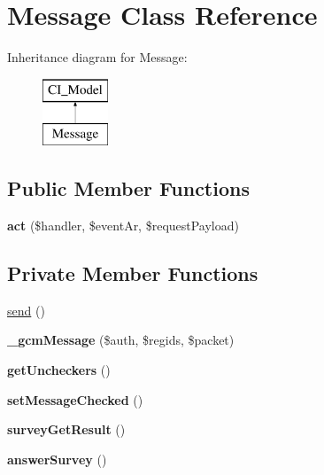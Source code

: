 \hypertarget{class_message}{\section{Message Class Reference}
\label{class_message}
}
Inheritance diagram for Message\-:\begin{figure}[H]
\begin{center}
\leavevmode
\includegraphics[height=2.000000cm]{class_message}
\end{center}
\end{figure}
\subsection*{Public Member Functions}
\begin{DoxyCompactItemize}
\item 
\hypertarget{class_message_a93f5121a14bacdf8b9974b9c1b911c88}{{\bfseries act} (\$handler, \$event\-Ar, \$request\-Payload)}\label{class_message_a93f5121a14bacdf8b9974b9c1b911c88}

\end{DoxyCompactItemize}
\subsection*{Private Member Functions}
\begin{DoxyCompactItemize}
\item 
\hyperlink{class_message_a3e5b1dbbbda744315ae2047620f83dc0}{send} ()
\item 
\hypertarget{class_message_adeffa2c002caa695265cad9dddf489f1}{{\bfseries \-\_\-gcm\-Message} (\$auth, \$regids, \$packet)}\label{class_message_adeffa2c002caa695265cad9dddf489f1}

\item 
\hypertarget{class_message_a9d4a91ab185f960f44b194cc9c9399fc}{{\bfseries get\-Uncheckers} ()}\label{class_message_a9d4a91ab185f960f44b194cc9c9399fc}

\item 
\hypertarget{class_message_a6a4a5c19656906d52a26ff8ff5f7c564}{{\bfseries set\-Message\-Checked} ()}\label{class_message_a6a4a5c19656906d52a26ff8ff5f7c564}

\item 
\hypertarget{class_message_ad0162945946c862c51b3bae7a686d37e}{{\bfseries survey\-Get\-Result} ()}\label{class_message_ad0162945946c862c51b3bae7a686d37e}

\item 
\hypertarget{class_message_a2f812f27ea595460e198e0c685968413}{{\bfseries answer\-Survey} ()}\label{class_message_a2f812f27ea595460e198e0c685968413}

\end{DoxyCompactItemize}
